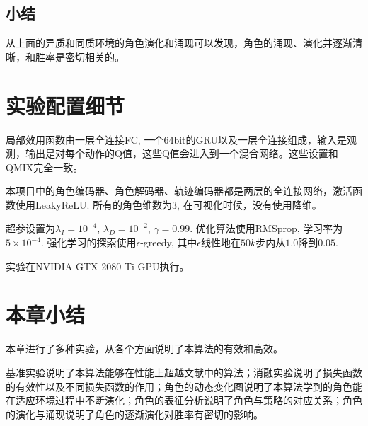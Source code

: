 \subsection{小结}
从上面的异质和同质环境的角色演化和涌现可以发现，角色的涌现、演化并逐渐清晰，和胜率是密切相关的。

\section{实验配置细节}\label{sec:exp-detail}
局部效用函数由一层全连接FC, 一个64bit的GRU以及一层全连接组成，输入是观测，输出是对每个动作的Q值，这些Q值会进入到一个混合网络。这些设置和QMIX完全一致。

本项目中的角色编码器、角色解码器、轨迹编码器都是两层的全连接网络，激活函数使用LeakyReLU. 所有的角色维数为3, 在可视化时候，没有使用降维。

超参设置为$\lambda_I=10^{-4}$, $\lambda_D=10^{-2}$, $\gamma=0.99$. 优化算法使用RMSprop, 学习率为$5\times 10^{-4}$. 强化学习的探索使用$\epsilon$-greedy, 其中$\epsilon$线性地在$50k$步内从$1.0$降到$0.05$. 

实验在NVIDIA GTX 2080 Ti GPU执行。

\section{本章小结}

本章进行了多种实验，从各个方面说明了本算法的有效和高效。

基准实验说明了本算法能够在性能上超越文献中的算法；消融实验说明了损失函数的有效性以及不同损失函数的作用；角色的动态变化图说明了本算法学到的角色能在适应环境过程中不断演化；角色的表征分析说明了角色与策略的对应关系；角色的演化与涌现说明了角色的逐渐演化对胜率有密切的影响。